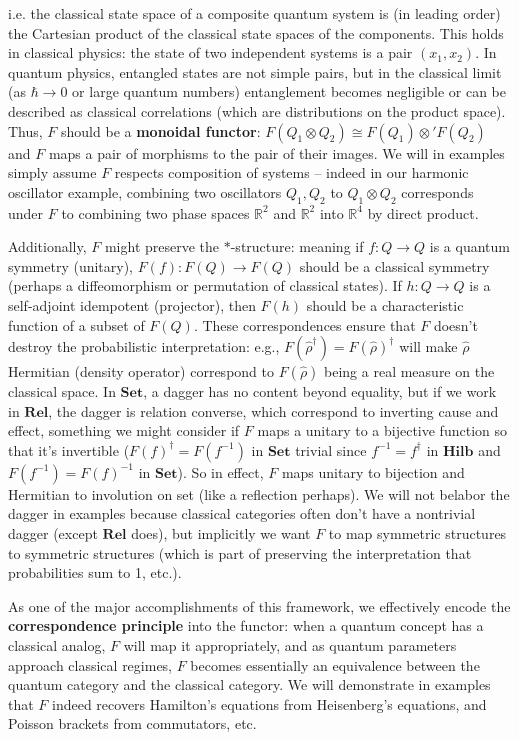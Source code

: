 i.e. the classical state space of a composite quantum system is (in leading order) the Cartesian product of the classical state spaces of the components. This holds in classical physics: the state of two independent systems is a pair $(x_1, x_2)$. In quantum physics, entangled states are not simple pairs, but in the classical limit (as $\hbar\to0$ or large quantum numbers) entanglement becomes negligible or can be described as classical correlations (which are distributions on the product space). Thus, $F$ should be a \textbf{monoidal functor}: $F(Q_1 \otimes Q_2) \cong F(Q_1)\otimes' F(Q_2)$ and $F$ maps a pair of morphisms to the pair of their images. We will in examples simply assume $F$ respects composition of systems – indeed in our harmonic oscillator example, combining two oscillators $Q_1, Q_2$ to $Q_1\otimes Q_2$ corresponds under $F$ to combining two phase spaces $\mathbb{R}^2$ and $\mathbb{R}^2$ into $\mathbb{R}^4$ by direct product.

\medskip

Additionally, $F$ might preserve the $*$-structure: meaning if $f: Q \to Q$ is a quantum symmetry (unitary), $F(f): F(Q) \to F(Q)$ should be a classical symmetry (perhaps a diffeomorphism or permutation of classical states). If $h: Q \to Q$ is a self-adjoint idempotent (projector), then $F(h)$ should be a characteristic function of a subset of $F(Q)$. These correspondences ensure that $F$ doesn't destroy the probabilistic interpretation: e.g., $F(\hat{\rho}^\dagger) = F(\hat{\rho})^\dagger$ will make $\hat{\rho}$ Hermitian (density operator) correspond to $F(\hat{\rho})$ being a real measure on the classical space. In $\mathbf{Set}$, a dagger has no content beyond equality, but if we work in $\mathbf{Rel}$, the dagger is relation converse, which correspond to inverting cause and effect, something we might consider if $F$ maps a unitary to a bijective function so that it's invertible ($F(f)^\dagger = F(f^{-1})$ in $\mathbf{Set}$ trivial since $f^{-1} = f^\dagger$ in $\mathbf{Hilb}$ and $F(f^{-1}) = F(f)^{-1}$ in $\mathbf{Set}$). So in effect, $F$ maps unitary to bijection and Hermitian to involution on set (like a reflection perhaps). We will not belabor the dagger in examples because classical categories often don't have a nontrivial dagger (except $\mathbf{Rel}$ does), but implicitly we want $F$ to map symmetric structures to symmetric structures (which is part of preserving the interpretation that probabilities sum to 1, etc.).

\medskip

As one of the major accomplishments of this framework, we effectively encode the \textbf{correspondence principle} into the functor: when a quantum concept has a classical analog, $F$ will map it appropriately, and as quantum parameters approach classical regimes, $F$ becomes essentially an equivalence between the quantum category and the classical category. We will demonstrate in examples that $F$ indeed recovers Hamilton's equations from Heisenberg's equations, and Poisson brackets from commutators, etc.

